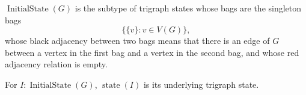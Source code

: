 \(\operatorname{InitialState}(G)\) is the subtype of trigraph states whose bags
are the singleton bags
\[
  \{\{v\}:v\in V(G)\},
\]
whose black adjacency between two bags means that there is an edge of \(G\)
between a vertex in the first bag and a vertex in the second bag, and whose red
adjacency relation is empty.

For \(I:\operatorname{InitialState}(G)\), \(\operatorname{state}(I)\) is its
underlying trigraph state.
